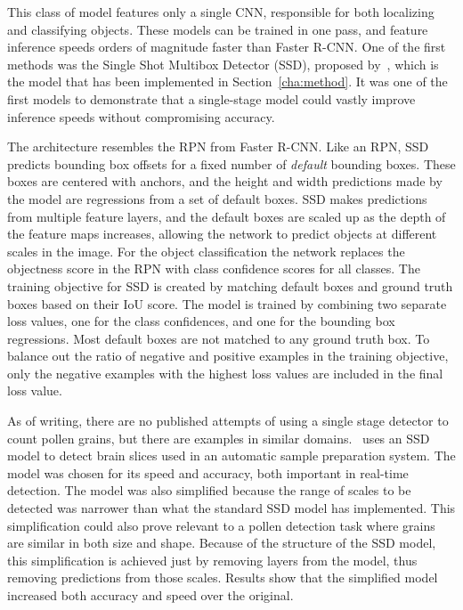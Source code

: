 This class of model features only a single CNN, responsible for both localizing and classifying objects.
These models can be trained in one pass, and feature inference speeds orders of magnitude faster than Faster R-CNN\@.
One of the first methods was the Single Shot Multibox Detector (SSD), proposed by\ \cite{liu_ssd_2016}, which is the model that has been implemented in Section~\ref{cha:method}.
It was one of the first models to demonstrate that a single-stage model could vastly improve inference speeds without compromising accuracy. 

The architecture resembles the RPN from Faster R-CNN\@.
Like an RPN, SSD predicts bounding box offsets for a fixed number of \textit{default} bounding boxes.
These boxes are centered with anchors, and the height and width predictions made by the model are regressions from a set of default boxes.
SSD makes predictions from multiple feature layers, and the default boxes are scaled up as the depth of the feature maps increases, allowing the network to predict objects at different scales in the image.
For the object classification the network replaces the objectness score in the RPN with class confidence scores for all classes.
The training objective for SSD is created by matching default boxes and ground truth boxes based on their IoU score.
The model is trained by combining two separate loss values, one for the class confidences, and one for the bounding box regressions.
Most default boxes are not matched to any ground truth box.
To balance out the ratio of negative and positive examples in the training objective, only the negative examples with the highest loss values are included in the final loss value.

As of writing, there are no published attempts of using a single stage detector to count pollen grains, but there are examples in similar domains.\ \textcite{liu_brain_2018} uses an SSD model to detect brain slices used in an automatic sample preparation system.
The model was chosen for its speed and accuracy, both important in real-time detection.
The model was also simplified because the range of scales to be detected was narrower than what the standard SSD model has implemented.
This simplification could also prove relevant to a pollen detection task where grains are similar in both size and shape.
Because of the structure of the SSD model, this simplification is achieved just by removing layers from the model, thus removing predictions from those scales.
Results show that the simplified model increased both accuracy and speed over the original.

